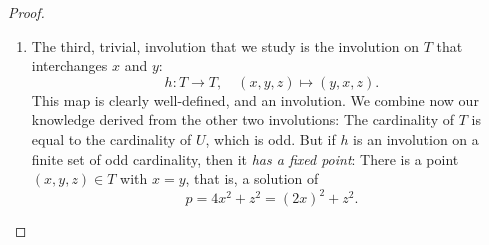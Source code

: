 \begin{proof}
\begin{enumerate}
    Also $g$ is an involution: $g(x, y, z) = (x - y + z, y, 2y - z)$ is mapped by $g$ to
    $((x - y + z) - y + (2y - z), y, 2y - (2y - z)) = (x, y, z)$.

    And finally $g$ has exactly one fixed point:
    \[
    (x, y, z) = g(x, y, z) = (x - y + z, y, 2y - z)
    \]
    implies that $y = z$, but then $p = 4xy + y^2 = (4x + y)y$, which holds only for $y = z = 1$ and
    $x = \frac{p - 1}{4}$.

    But if $g$ is an involution on $U$ that has exactly one fixed point, then
    \emph{the cardinality of $U$ is odd.}

    \item The third, trivial, involution that we study is the involution on $T$ that interchanges
    $x$ and $y$:
    \[
    h : T \to T, \quad (x, y, z) \mapsto (y, x, z).
    \]
    This map is clearly well-defined, and an involution. We combine now our knowledge derived from
    the other two involutions: The cardinality of $T$ is equal to the cardinality of $U$, which is
    odd. But if $h$ is an involution on a finite set of odd cardinality, then
    it \emph{has a fixed point}: There is a point $(x, y, z) \in T$ with $x = y$, that is,
    a solution of
    \[
    p = 4x^2 + z^2 = (2x)^2 + z^2.
    \]
\end{enumerate}

\end{proof}

